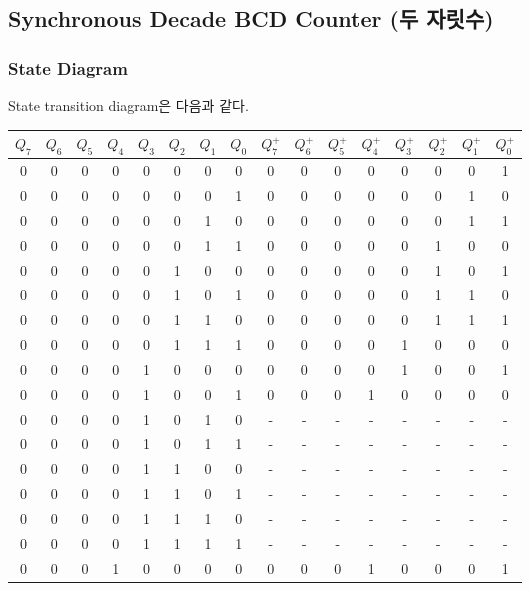 \documentclass{scrartcl}
\begin{document}
\subsection{Synchronous Decade BCD Counter (두 자릿수)}
\subsubsection{State Diagram}
State transition diagram은 다음과 같다.
\begin{table}[H]
  \centering
  \begin{tabular}{cccccccc|cccccccc}
    \hline
    \(Q_7\) & \(Q_6\) & \(Q_5\) & \(Q_4\) & \(Q_3\) & \(Q_2\) & \(Q_1\) & \(Q_0\) & \(Q^+_7\) & \(Q^+_6\) & \(Q^+_5\) & \(Q^+_4\) & \(Q^+_3\) & \(Q^+_2\) & \(Q^+_1\) & \(Q^+_0\) \\
    \hline
    0 & 0 & 0 & 0 & 0 & 0 & 0 & 0 & 0 & 0 & 0 & 0 & 0 & 0 & 0 & 1 \\
    0 & 0 & 0 & 0 & 0 & 0 & 0 & 1 & 0 & 0 & 0 & 0 & 0 & 0 & 1 & 0 \\
    0 & 0 & 0 & 0 & 0 & 0 & 1 & 0 & 0 & 0 & 0 & 0 & 0 & 0 & 1 & 1 \\
    0 & 0 & 0 & 0 & 0 & 0 & 1 & 1 & 0 & 0 & 0 & 0 & 0 & 1 & 0 & 0 \\
    0 & 0 & 0 & 0 & 0 & 1 & 0 & 0 & 0 & 0 & 0 & 0 & 0 & 1 & 0 & 1 \\
    0 & 0 & 0 & 0 & 0 & 1 & 0 & 1 & 0 & 0 & 0 & 0 & 0 & 1 & 1 & 0 \\
    0 & 0 & 0 & 0 & 0 & 1 & 1 & 0 & 0 & 0 & 0 & 0 & 0 & 1 & 1 & 1 \\
    0 & 0 & 0 & 0 & 0 & 1 & 1 & 1 & 0 & 0 & 0 & 0 & 1 & 0 & 0 & 0 \\
    0 & 0 & 0 & 0 & 1 & 0 & 0 & 0 & 0 & 0 & 0 & 0 & 1 & 0 & 0 & 1 \\
    0 & 0 & 0 & 0 & 1 & 0 & 0 & 1 & 0 & 0 & 0 & 1 & 0 & 0 & 0 & 0 \\
    0 & 0 & 0 & 0 & 1 & 0 & 1 & 0 & - & - & - & - & - & - & - & - \\
    0 & 0 & 0 & 0 & 1 & 0 & 1 & 1 & - & - & - & - & - & - & - & - \\
    0 & 0 & 0 & 0 & 1 & 1 & 0 & 0 & - & - & - & - & - & - & - & - \\
    0 & 0 & 0 & 0 & 1 & 1 & 0 & 1 & - & - & - & - & - & - & - & - \\
    0 & 0 & 0 & 0 & 1 & 1 & 1 & 0 & - & - & - & - & - & - & - & - \\
    0 & 0 & 0 & 0 & 1 & 1 & 1 & 1 & - & - & - & - & - & - & - & - \\
    0 & 0 & 0 & 1 & 0 & 0 & 0 & 0 & 0 & 0 & 0 & 1 & 0 & 0 & 0 & 1 \\

\end{tabular}
\end{table}
\end{document}
